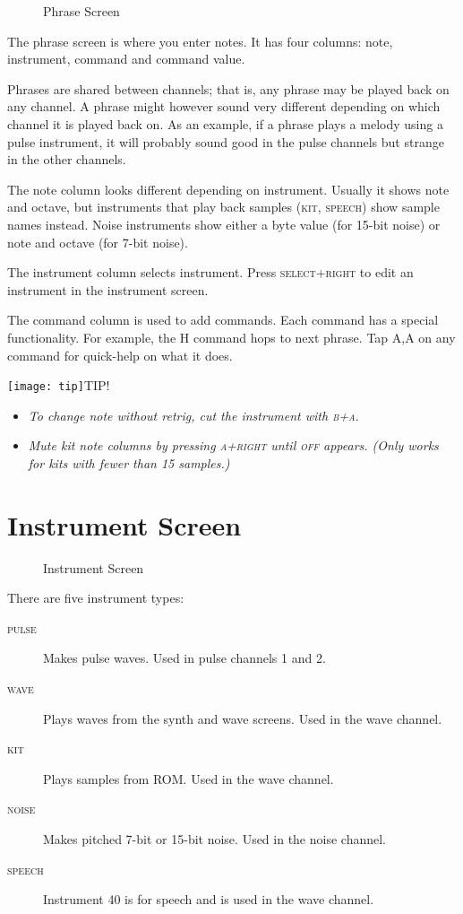 \begin{figure}[hbtp]
\centering
{}
\caption{Phrase Screen}
\end{figure}

The phrase screen is where you enter notes. It has four columns: note, instrument, command and command value.

Phrases are shared between channels; that is, any phrase may be played back on any channel. A phrase might however sound very different depending on which channel it is played back on. As an example, if a phrase plays a melody using a pulse instrument, it will probably sound good in the pulse channels but strange in the other channels.

The note column looks different depending on instrument. Usually it shows note and octave, but instruments that play back samples (\textsc{kit}, \textsc{speech}) show sample names instead. Noise instruments show either a byte value (for 15-bit noise) or note and octave (for 7-bit noise).

The instrument column selects instrument. Press \textsc{select+right} to edit an instrument in the instrument screen.

The command column is used to add commands. Each command has a special functionality. For example, the H command hops to next phrase. Tap \textsc{A,A} on any command for quick-help on what it does.

\texttt{[image: tip]}TIP!
\begin{itemize}
    \item \textit{To change note without retrig, cut the instrument with \textsc{b+a}.}
    \item \textit{Mute kit note columns by pressing \textsc{a+right} until \textsc{off} appears. (Only works for kits with fewer than 15 samples.)}
\end{itemize}

\section{Instrument Screen}

\begin{figure}[hbtp]
\centering
{}
\caption{Instrument Screen}
\label{fig:instr2}
\end{figure}

There are five instrument types:

\begin{description}
\item[\textsc{pulse}] Makes pulse waves. Used in pulse channels 1 and 2.
\item[\textsc{wave}] Plays waves from the synth and wave screens. Used in the wave channel.
\item[\textsc{kit}] Plays samples from ROM. Used in the wave channel.
\item[\textsc{noise}] Makes pitched 7-bit or 15-bit noise. Used in the noise channel.
\item[\textsc{speech}] Instrument 40 is for speech and is used in the wave channel.
\end{description}

